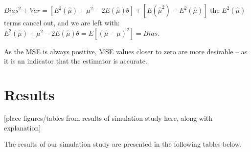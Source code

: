 \documentclass[12pt, twoside]{amherstthesis}
\begin{document}
\(Bias^2 + Var = [E^2(\hat{\mu}) +\mu^2 -2E(\hat{\mu})\theta] + [E(\hat{\mu}^2) - E^2(\hat{\mu})]\) the \(E^2(\hat{\mu})\) terms cancel out, and we are left with: \(E^2(\hat{\mu}) +\mu^2 -2E(\hat{\mu})\theta = E[(\hat{\mu} -\mu)^2] = Bias\).

As the MSE is always positive, MSE values closer to zero are more desirable -- as it is an indicator that the estimator is accurate.

\hypertarget{results}{%
\section{Results}\label{results}}

{[}place figures/tables from results of simulation study here, along with explanation{]}

The results of our simulation study are presented in the following tables below.
\end{document}
